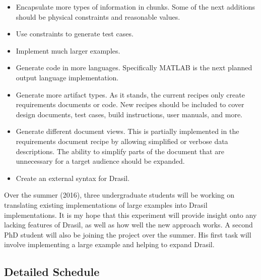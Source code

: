 \documentclass{article}
\begin{document}
\begin{itemize}
\item Encapsulate more types of information in chunks. Some of the next additions should be 		physical constraints and reasonable values.
\item Use constraints to generate test cases.
\item Implement much larger examples.
\item Generate code in more languages. Specifically MATLAB is the next planned output 
		language implementation.
\item Generate more artifact types. As it stands, the current recipes only create 
		requirements documents or code. New recipes should be included to cover design 
		documents, test cases, build instructions, user manuals, and more.
\item Generate different document views. This is partially implemented in the requirements 
		document recipe by allowing simplified or verbose data descriptions. The ability to 
		simplify parts of the document that are unnecessary for a target audience should be 
		expanded.
\item Create an external syntax for Drasil.
\end{itemize}

Over the summer (2016), three undergraduate students will be working on translating existing implementations of large examples into Drasil implementations. It is my hope that this experiment will provide insight onto any lacking features of Drasil, as well as how well the new approach works. A second PhD student will also be joining the project over the summer. His first task will involve implementing a large example and helping to expand Drasil.

\subsection{Detailed Schedule}
\label{subsec:schedule}
\end{document}
